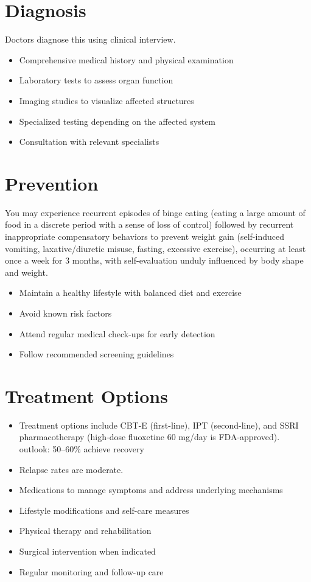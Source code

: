 \section{Diagnosis}
Doctors diagnose this using clinical interview.

\begin{itemize}[noitemsep]
  \item Comprehensive medical history and physical examination
  \item Laboratory tests to assess organ function
  \item Imaging studies to visualize affected structures
  \item Specialized testing depending on the affected system
  \item Consultation with relevant specialists
\end{itemize}
\section{Prevention}
You may experience recurrent episodes of binge eating (eating a large amount of food in a discrete period with a sense of loss of control) followed by recurrent inappropriate compensatory behaviors to prevent weight gain (self-induced vomiting, laxative/diuretic misuse, fasting, excessive exercise), occurring at least once a week for 3 months, with self-evaluation unduly influenced by body shape and weight.

\begin{itemize}[noitemsep]
  \item Maintain a healthy lifestyle with balanced diet and exercise
  \item Avoid known risk factors
  \item Attend regular medical check-ups for early detection
  \item Follow recommended screening guidelines
\end{itemize}
\section{Treatment Options}
\begin{itemize}[noitemsep]
  \item Treatment options include CBT-E (first-line), IPT (second-line), and SSRI pharmacotherapy (high-dose fluoxetine 60 mg/day is FDA-approved). outlook: 50--60\% achieve recovery
  \item Relapse rates are moderate.
  \item Medications to manage symptoms and address underlying mechanisms
  \item Lifestyle modifications and self-care measures
  \item Physical therapy and rehabilitation
  \item Surgical intervention when indicated
  \item Regular monitoring and follow-up care
\end{itemize}
